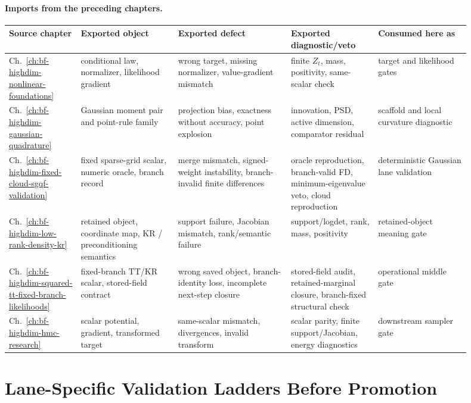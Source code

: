\paragraph{Imports from the preceding chapters.}
\begingroup
\scriptsize
\setlength{\tabcolsep}{2pt}
\begin{longtable}{@{}p{0.14\linewidth}p{0.19\linewidth}p{0.22\linewidth}p{0.17\linewidth}p{0.18\linewidth}@{}}
\toprule
Source chapter & Exported object & Exported defect & Exported diagnostic/veto
& Consumed here as \\
\midrule
\endhead
Ch.~\ref{ch:bf-highdim-nonlinear-foundations} & conditional law, normalizer,
likelihood gradient & wrong target, missing normalizer, value-gradient
mismatch & finite \(Z_t\), mass, positivity, same-scalar check & target and
likelihood gates \\
Ch.~\ref{ch:bf-highdim-gaussian-quadrature} & Gaussian moment pair and
point-rule family & projection bias, exactness without accuracy, point explosion
& innovation, PSD, active dimension, comparator residual & scaffold and local
curvature diagnostic \\
Ch.~\ref{ch:bf-highdim-fixed-cloud-sgqf-validation} & fixed sparse-grid scalar,
numeric oracle, branch record & merge mismatch, signed-weight instability,
branch-invalid finite differences & oracle reproduction, branch-valid FD,
minimum-eigenvalue veto, cloud reproduction & deterministic Gaussian lane
validation \\
Ch.~\ref{ch:bf-highdim-low-rank-density-kr} & retained object, coordinate map,
KR / preconditioning semantics & support failure, Jacobian mismatch,
rank/semantic failure & support/logdet, rank, mass, positivity & retained-object
meaning gate \\
Ch.~\ref{ch:bf-highdim-squared-tt-fixed-branch-likelihoods} & fixed-branch TT/KR
scalar, stored-field contract & wrong saved object, branch-identity loss,
incomplete next-step closure & stored-field audit, retained-marginal closure,
branch-fixed structural check & operational middle gate \\
Ch.~\ref{ch:bf-highdim-hmc-research} & scalar potential, gradient, transformed
target & same-scalar mismatch, divergences, invalid transform & scalar parity,
finite support/Jacobian, energy diagnostics & downstream sampler gate \\
\bottomrule
\end{longtable}
\endgroup

\section{Lane-Specific Validation Ladders Before Promotion}
\label{sec:bf-hd-validation-lane-ladders}

